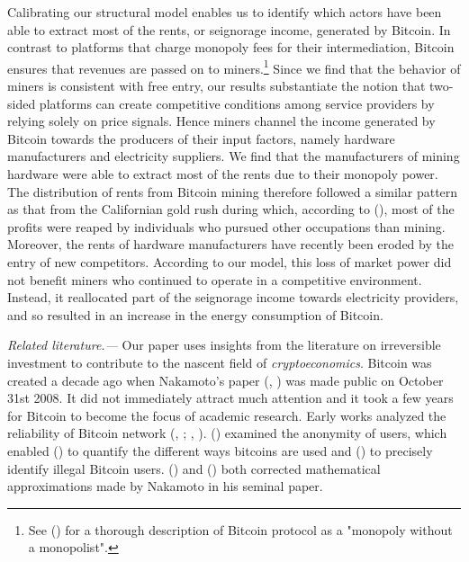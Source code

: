 \documentclass[12pt, a4paper]{article}
\renewcommand{\citep}[1]{\citeauthor{#1}, \citeyear{#1}}
\begin{document}
Calibrating our structural model enables us to identify which actors have been able to extract most of the rents, or seignorage income, generated
by Bitcoin. In contrast to platforms
that charge monopoly fees for their intermediation, Bitcoin ensures that revenues
are passed on to miners.\footnote{See \citeauthor{Huberman} (\citeyear{Huberman}) for a thorough description of Bitcoin
protocol as a "monopoly without a monopolist".} Since we find that the behavior of miners is consistent with free entry, our results substantiate the notion that
two-sided platforms can create competitive conditions among service providers by relying solely on price signals. Hence miners channel
the income generated by Bitcoin towards the producers of their input factors, namely hardware manufacturers and electricity suppliers. We find that the manufacturers of mining hardware
were able to extract most of the rents due to their monopoly power. The distribution of rents from Bitcoin mining
therefore followed a similar pattern as that from the Californian gold rush during which, according to \citeauthor{Clay} (\citeyear{Clay}),
most of the profits were reaped by individuals who pursued other
occupations than mining. Moreover, the rents of hardware manufacturers
have recently been eroded by the entry of new competitors. According to our model, this loss of market power did not
benefit miners who continued to operate in a competitive environment.
Instead, it reallocated part of the seignorage income
towards electricity providers, and so resulted in an increase in the energy consumption of Bitcoin.




\emph{Related literature.---} Our paper uses insights from the literature on
irreversible investment to contribute to the nascent field of \emph{%
cryptoeconomics}. Bitcoin was created a decade ago when Nakamoto's
paper (\citep{Satoshi}) was made public on October 31st 2008. It did not
immediately attract much attention and it took a few years for Bitcoin to
become the focus of academic research. Early works analyzed the
reliability of Bitcoin network (\citeauthor{fast-payments}, %
\citeyear{fast-payments}; \citeauthor{network}, \citeyear{network}). %
\citeauthor{Reid} (\citeyear{Reid}) examined the anonymity of users, which
enabled \citeauthor{Athey} (\citeyear{Athey}) to quantify the different ways
bitcoins are used and \citeauthor{Foley} (\citeyear{Foley}) to precisely
identify illegal Bitcoin users. \citeauthor{Grunspan} (\citeyear{Grunspan})
and \citeauthor{Bowden} (\citeyear{Bowden}) both corrected mathematical
approximations made by Nakamoto in his seminal paper.
\end{document}
